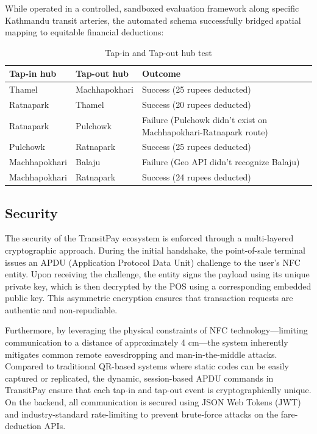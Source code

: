 \documentclass[manuscript,review,anonymous]{acmart}
\begin{document}
While operated in a controlled, sandboxed evaluation framework along specific Kathmandu transit arteries, the automated schema successfully bridged spatial mapping to equitable financial deductions:

\begin{table}[H]
  \centering
  \caption{Tap-in and Tap-out hub test}
  \label{tab:tapped_in_and_tapped_out}
  \begin{tabularx}{\columnwidth}{>{\RaggedRight\arraybackslash}p{2.5cm} >{\RaggedRight\arraybackslash}X >{\RaggedRight\arraybackslash}X}
    \toprule
    \textbf{Tap-in hub} & \textbf{Tap-out hub} & \textbf{Outcome} \\
    \midrule 
    Thamel & Machhapokhari & Success (25 rupees deducted) \\
    Ratnapark & Thamel & Success (20 rupees deducted) \\
    Ratnapark & Pulchowk & Failure (Pulchowk didn't exist on Machhapokhari-Ratnapark route) \\
    Pulchowk & Ratnapark & Success (25 rupees deducted) \\
    Machhapokhari & Balaju & Failure (Geo API didn't recognize Balaju) \\
    Machhapokhari & Ratnapark & Success (24 rupees deducted) \\
    \bottomrule
  \end{tabularx}
\end{table}


\subsection{Security}

The security of the TransitPay ecosystem is enforced through a multi-layered cryptographic approach. During the initial handshake, the point-of-sale terminal issues an APDU (Application Protocol Data Unit) challenge to the user's NFC entity. Upon receiving the challenge, the entity signs the payload using its unique private key, which is then decrypted by the POS using a corresponding embedded public key. This asymmetric encryption ensures that transaction requests are authentic and non-repudiable. 

Furthermore, by leveraging the physical constraints of NFC technology—limiting communication to a distance of approximately 4 cm—the system inherently mitigates common remote eavesdropping and man-in-the-middle attacks. Compared to traditional QR-based systems where static codes can be easily captured or replicated, the dynamic, session-based APDU commands in TransitPay ensure that each tap-in and tap-out event is cryptographically unique. On the backend, all communication is secured using JSON Web Tokens (JWT) and industry-standard rate-limiting to prevent brute-force attacks on the fare-deduction APIs.
\end{document}
